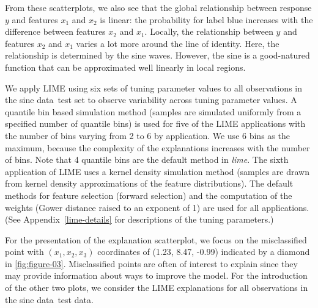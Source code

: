 \documentclass[AMS,STIX2COL]{WileyNJD-v2}\usepackage[]{graphicx}\usepackage[]{color}
\newcommand{\data}{sine data}
\begin{document}
From these scatterplots, we also see that the global relationship between response $y$ and features $x_1$ and $x_2$ is linear: the probability for label blue increases with the difference between features $x_2$ and $x_1$. Locally, the relationship between $y$ and features $x_2$ and $x_1$ varies a lot more around the line of identity. Here, the relationship is determined by the sine waves. However, the sine is a good-natured function that can be approximated well linearly in local regions.

We apply LIME using six sets of tuning parameter values to all observations in the \data \ test set to observe variability across tuning parameter values. A quantile bin based simulation method (samples are simulated uniformly from a specified number of quantile bins) is used for five of the LIME applications with the number of bins varying from 2 to 6 by application. We use 6 bins as the maximum, because the complexity of the explanations increases with the number of bins. Note that 4 quantile bins are the default method in \emph{lime}. The sixth application of LIME uses a kernel density simulation method (samples are drawn from kernel density approximations of the feature distributions). The default methods for feature selection (forward selection) and the computation of the weights (Gower distance raised to an exponent of 1) are used for all applications. (See Appendix~\ref{lime-details} for descriptions of the tuning parameters.)

For the presentation of the explanation scatterplot, we focus on the misclassified point with $(x_1, x_2, x_3)$ coordinates of (1.23, 8.47, -0.99) indicated by a diamond in \autoref{fig:figure-03}. Misclassified points are often of interest to explain since they may provide information about ways to improve the model. For the introduction of the other two  plots, we consider the LIME explanations for  all observations in the \data \ test data.
\end{document}
